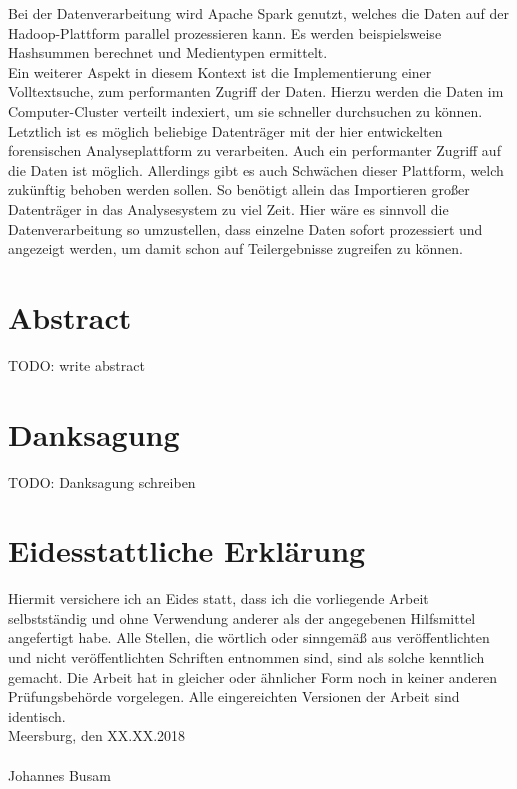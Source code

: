 \noindent
Bei der Datenverarbeitung wird Apache Spark genutzt, welches die Daten auf der Hadoop-Plattform parallel prozessieren kann. Es werden beispielsweise Hashsummen berechnet und Medientypen ermittelt.\\
Ein weiterer Aspekt in diesem Kontext ist die Implementierung einer Volltextsuche, zum performanten Zugriff der Daten. Hierzu werden die Daten im Computer-Cluster verteilt indexiert, um sie schneller durchsuchen zu können.\\

\noindent
Letztlich ist es möglich beliebige Datenträger mit der hier entwickelten forensischen Analyseplattform zu verarbeiten. Auch ein performanter Zugriff auf die Daten ist möglich. Allerdings gibt es auch Schwächen dieser Plattform, welch zukünftig behoben werden sollen. So benötigt allein das Importieren großer Datenträger in das Analysesystem zu viel Zeit. Hier wäre es sinnvoll die Datenverarbeitung so umzustellen, dass einzelne Daten sofort prozessiert und angezeigt werden, um damit schon auf Teilergebnisse zugreifen zu können.


\newpage
\section*{Abstract}
TODO: write abstract
\newpage

\section*{Danksagung}
TODO: Danksagung schreiben
\newpage

\section*{Eidesstattliche Erklärung}

Hiermit versichere ich an Eides statt, dass ich die vorliegende Arbeit selbstständig und
ohne Verwendung anderer als der angegebenen Hilfsmittel angefertigt habe. Alle Stellen,
die wörtlich oder sinngemäß aus veröffentlichten und nicht veröffentlichten Schriften
entnommen sind, sind als solche kenntlich gemacht. Die Arbeit hat in gleicher oder
ähnlicher Form noch in keiner anderen Prüfungsbehörde vorgelegen. Alle eingereichten
Versionen der Arbeit sind identisch.\\
\newline
\noindent
Meersburg, den XX.XX.2018 \\
\vspace{1.5cm} \\
Johannes Busam\newline

\newpage
